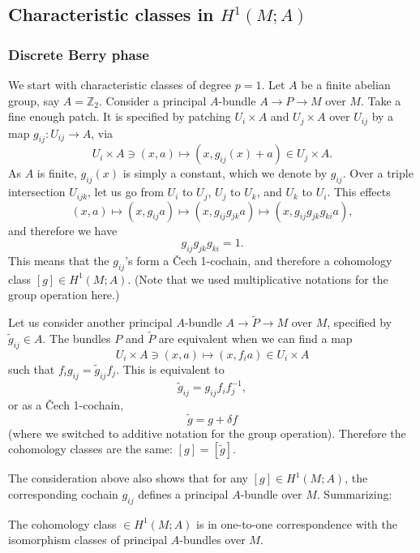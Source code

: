 \documentclass[12pt]{article}
\numberwithin{equation}{section}
\theoremstyle{remark}
\def\bZ{\mathbb{Z}}
\begin{document}
\subsection{Characteristic classes in $H^1(M;A)$}

\subsubsection{Discrete Berry phase}
We start with characteristic classes of degree $p=1$.
Let $A$ be a finite abelian group, say $A=\bZ_2$.
Consider a principal $A$-bundle $A\to P\to M$ over $M$.
Take a fine enough patch.
It is specified by patching $U_i\times A$ and $U_j\times A$ over $U_{ij}$ by a map $g_{ij}:U_{ij}\to A$, via \begin{equation}
   U_i\times A\ni (x,a) \mapsto (x,g_{ij}(x)+a)\in U_j\times A.
\end{equation} 
As $A$ is finite, $g_{ij}(x)$ is simply a constant, which we denote by $g_{ij}$.
Over a triple intersection $U_{ijk}$, let us
go from $U_i$ to $U_j$, $U_j$ to $U_k$, and $U_k$ to $U_i$. This effects
\begin{equation}
(x,a) \mapsto (x,g_{ij}a)\mapsto (x,g_{ij}g_{jk}a)\mapsto (x,g_{ij} g_{jk}g_{ki}a),
\end{equation} and therefore we have \begin{equation}
  g_{ij}g_{jk}g_{ki}=1.
\end{equation}
This means that the $g_{ij}$'s form a \v Cech 1-cochain, and therefore a cohomology class $[g] \in H^1(M;A)$.
(Note that we used multiplicative notations for the group operation here.)

Let us consider another principal $A$-bundle $A\to \tilde P\to M$ over $M$,
specified by $\tilde g_{ij}\in A$.
The bundles $P$ and $\tilde P$ are equivalent when we can find a map
\begin{equation}
  U_i\times A \ni (x,a) \mapsto (x,f_i a)\in U_i\times A
\end{equation}
such that $f_i g_{ij}= \tilde g_{ij} f_j$.
This is equivalent to \begin{equation}
\tilde g_{ij} = g_{ij} f_i f_j^{-1}, 
\end{equation} or as a \v Cech 1-cochain, \begin{equation}
\tilde g = g + \delta f
\end{equation} (where we switched to additive notation for the group operation).
Therefore the cohomology classes are the same: $[g]=[\tilde g]$.

The consideration above also shows that for any $[g]\in H^1(M;A)$,
the corresponding cochain $g_{ij}$ defines a principal $A$-bundle over $M$.
Summarizing:
\begin{proposition}
  The cohomology class $\in H^1(M;A)$ is in one-to-one correspondence with the isomorphism classes of principal $A$-bundles over $M$.
\end{proposition}
\end{document}
